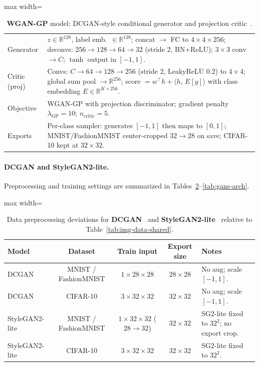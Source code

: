 \begin{table}[H]
\centering
\scriptsize
\caption{\textbf{WGAN-GP} model: DCGAN-style conditional generator and projection critic~\citep{miyato2018cgans}.}
\label{tab:wgangp-arch}
\begin{adjustbox}{max width=\linewidth}
\begin{tabularx}{\linewidth}{@{}lX@{}}
\toprule
Generator & $z{\in}\mathbb{R}^{128}$, label emb.\ $\in\mathbb{R}^{128}$; concat $\to$ FC to $4{\times}4{\times}256$; deconvs: $256{\to}128{\to}64{\to}32$ (stride 2, BN+ReLU); $3{\times}3$ conv $\to C$; $\tanh$ output in $[-1,1]$. \\[2pt]
Critic (proj) & Convs: $C{\to}64{\to}128{\to}256$ (stride 2, LeakyReLU 0.2) to $4{\times}4$; global sum pool $\to \mathbb{R}^{256}$; score $= w^\top h + \langle h,\,E[y]\rangle$ with class embedding $E\!\in\!\mathbb{R}^{K\times256}$. \\
Objective & WGAN-GP with projection discriminator; gradient penalty $\lambda_{\text{GP}}{=}10$; $n_{\text{critic}}{=}5$. \\
Exports & Per-class sampler: generates $[-1,1]$ then maps to $[0,1]$; MNIST/FashionMNIST center-cropped $32{\to}28$ on save; CIFAR-10 kept at $32{\times}32$. \\
\bottomrule
\end{tabularx}
\end{adjustbox}
\end{table}

\paragraph{DCGAN and StyleGAN2-lite.}
Preprocessing and training settings are summarized in Tables~\ref{tab:gans-data}--\ref{tab:gans-arch}.

\begin{table}[H]
\centering
\scriptsize
\caption{Data preprocessing deviations for \textbf{DCGAN}~\citep{radford2016unsupervised} and \textbf{StyleGAN2-lite}~\citep{karras2020analyzing} relative to Table~\ref{tab:img-data-shared}.}
\label{tab:gans-data}
\begin{adjustbox}{max width=\linewidth}
\begin{tabularx}{\linewidth}{@{}lcccX@{}}
\toprule
Model & Dataset & Train input & Export size & Notes \\
\midrule
DCGAN & MNIST / FashionMNIST & $1{\times}28{\times}28$ & $28{\times}28$ & No aug; scale $[-1,1]$. \\
DCGAN & CIFAR-10             & $3{\times}32{\times}32$ & $32{\times}32$ & No aug; scale $[-1,1]$. \\
\midrule
StyleGAN2-lite & MNIST / FashionMNIST & $1{\times}32{\times}32$ ($28\!\to\!32$) & $32{\times}32$ & SG2-lite fixed to $32^2$; no export crop. \\
StyleGAN2-lite & CIFAR-10             & $3{\times}32{\times}32$                  & $32{\times}32$ & SG2-lite fixed to $32^2$. \\
\bottomrule
\end{tabularx}
\end{adjustbox}
\end{table}

